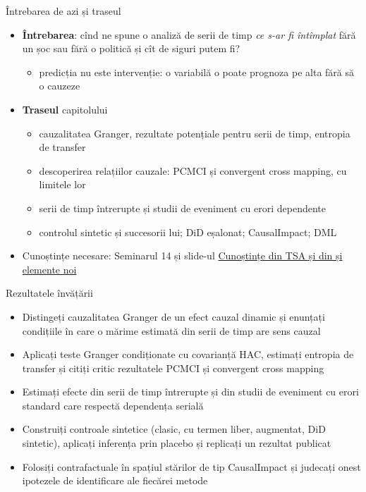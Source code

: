 
\begin{frame}{Întrebarea de azi și traseul}
\itemsize{\small}
\begin{itemize}
    \item \textbf{Întrebarea}: cînd ne spune o analiză de serii de timp \textit{ce s-ar fi întîmplat} fără un șoc sau fără o politică și cît de siguri putem fi?
    \begin{itemize}
        \item predicția nu este intervenție: o variabilă o poate prognoza pe alta fără să o cauzeze
    \end{itemize}
    \item \textbf{Traseul} capitolului
    \begin{itemize}
        \item cauzalitatea Granger, rezultate potențiale pentru serii de timp, entropia de transfer
        \item descoperirea relațiilor cauzale: PCMCI și convergent cross mapping, cu limitele lor
        \item serii de timp întrerupte și studii de eveniment cu erori dependente
        \item controlul sintetic și succesorii lui; DiD eșalonat; CausalImpact; DML
    \end{itemize}
    \item Cunoștințe necesare: Seminarul 14 și slide-ul \hyperlink{c14known}{\textcolor{MainBlue}{Cunoștințe din TSA și din  și elemente noi}}
\end{itemize}
\end{frame}

\begin{frame}{Rezultatele învățării}
\itemsize{\small}
\begin{itemize}
    \item Distingeți cauzalitatea Granger de un efect cauzal dinamic și enunțați condițiile în care o mărime estimată din serii de timp are sens cauzal
    \item Aplicați teste Granger condiționate cu covarianță HAC, estimați entropia de transfer și citiți critic rezultatele PCMCI și convergent cross mapping
    \item Estimați efecte din serii de timp întrerupte și din studii de eveniment cu erori standard care respectă dependența serială
    \item Construiți controale sintetice (clasic, cu termen liber, augmentat, DiD sintetic), aplicați inferența prin placebo și replicați un rezultat publicat
    \item Folosiți contrafactuale în spațiul stărilor de tip CausalImpact și judecați onest ipotezele de identificare ale fiecărei metode
\end{itemize}
\end{frame}

